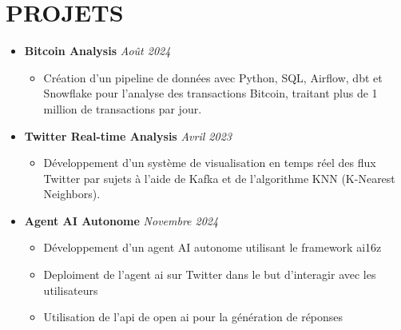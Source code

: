\documentclass[11pt,a4paper]{article}
\newcommand{\resumeItem}[1]{
  \item\footnotesize{
    {#1 \vspace{-1pt}}
  }
}
\newcommand{\resumeProjectHeading}[2]{
  \item
  {\footnotesize\textbf{#1}} \hfill {\footnotesize\textit{#2}}
}
\newcommand{\resumeSubHeadingListStart}{\begin{itemize}[leftmargin=0in, label={}]}
\newcommand{\resumeSubHeadingListEnd}{\end{itemize}}
\newcommand{\resumeItemListStart}{\begin{itemize}[label={\textbullet}]}
\newcommand{\resumeItemListEnd}{\end{itemize}\vspace{0pt}}
\begin{document}
\section{PROJETS}
\resumeSubHeadingListStart
    \resumeProjectHeading
      {Bitcoin Analysis} {Août 2024}
      \resumeItemListStart
        \resumeItem{Création d'un pipeline de données avec Python, SQL, Airflow, dbt et Snowflake pour l'analyse des transactions Bitcoin, traitant plus de 1 million de transactions par jour.}
      \resumeItemListEnd
    \resumeProjectHeading
      {Twitter Real-time Analysis} {Avril 2023}
      \resumeItemListStart
        \resumeItem{Développement d'un système de visualisation en temps réel des flux Twitter par sujets à l'aide de Kafka et de l'algorithme KNN (K-Nearest Neighbors).}
      \resumeItemListEnd
    \resumeProjectHeading
      {Agent AI Autonome} {Novembre 2024}
      \resumeItemListStart
        \resumeItem{Développement d'un agent AI autonome utilisant le framework ai16z}
        \resumeItem{Deploiment de l'agent ai sur Twitter dans le but d'interagir avec les utilisateurs}
        \resumeItem{Utilisation de l'api de open ai pour la génération de réponses}
      \resumeItemListEnd
\resumeSubHeadingListEnd
\end{document}
